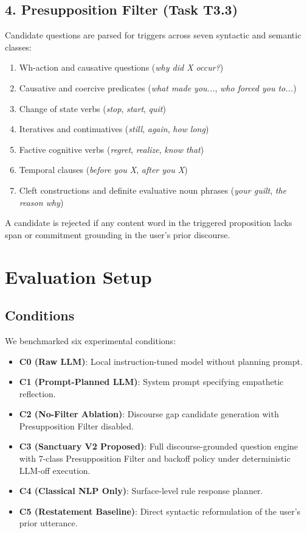 \documentclass[11pt,a4paper]{article}
\begin{document}
\subsection{4. Presupposition Filter (Task T3.3)}
Candidate questions are parsed for triggers across seven syntactic and semantic classes:
\begin{enumerate}
    \item Wh-action and causative questions (\emph{why did X occur?})
    \item Causative and coercive predicates (\emph{what made you...}, \emph{who forced you to...})
    \item Change of state verbs (\emph{stop}, \emph{start}, \emph{quit})
    \item Iteratives and continuatives (\emph{still}, \emph{again}, \emph{how long})
    \item Factive cognitive verbs (\emph{regret}, \emph{realize}, \emph{know that})
    \item Temporal clauses (\emph{before you X}, \emph{after you X})
    \item Cleft constructions and definite evaluative noun phrases (\emph{your guilt}, \emph{the reason why})
\end{enumerate}
A candidate is rejected if any content word in the triggered proposition lacks span or commitment grounding in the user's prior discourse.

\section{Evaluation Setup}

\subsection{Conditions}
We benchmarked six experimental conditions:
\begin{itemize}
    \item \textbf{C0 (Raw LLM)}: Local instruction-tuned model without planning prompt.
    \item \textbf{C1 (Prompt-Planned LLM)}: System prompt specifying empathetic reflection.
    \item \textbf{C2 (No-Filter Ablation)}: Discourse gap candidate generation with Presupposition Filter disabled.
    \item \textbf{C3 (Sanctuary V2 Proposed)}: Full discourse-grounded question engine with 7-class Presupposition Filter and backoff policy under deterministic LLM-off execution.
    \item \textbf{C4 (Classical NLP Only)}: Surface-level rule response planner.
    \item \textbf{C5 (Restatement Baseline)}: Direct syntactic reformulation of the user's prior utterance.
\end{itemize}
\end{document}
